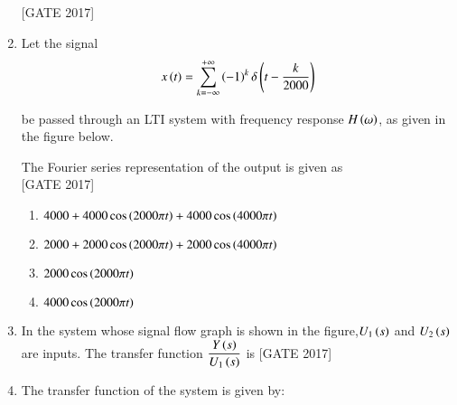 \documentclass[journal,12pt,onecolumn]{IEEEtran}
\theoremstyle{remark}
\begin{document}
\begin{enumerate}
\hfill{[GATE 2017]} \begin{enumerate}
\end{enumerate}
\item Let the signal
\begin{align*}
  x\left(t\right) = \sum_{k=-\infty}^{+\infty} \left(-1\right)^k \delta \left( t - \frac{k}{2000} \right)
\end{align*}

be passed through an LTI system with frequency response $H\left(\omega\right)$, as given in the figure below.



The Fourier series representation of the output is given as\\

\hfill{[GATE 2017]} \begin{enumerate}
 
        \item $ 4000 + 4000 \cos\left(2000 \pi t\right) + 4000 \cos\left(4000 \pi t\right) $   \item$ 2000 + 2000 \cos\left(2000 \pi t\right) + 2000 \cos\left(4000 \pi t\right)$
        \item $ 2000 \cos\left(2000 \pi t\right) $
       \item $ 4000 \cos\left(2000 \pi t\right)$\\
    
\end{enumerate}

\item In the system whose signal flow graph is shown in the figure,$ U_1\left(s\right)$ and  $U_2\left(s\right)$ are inputs. The transfer function $\dfrac{Y\left(s\right)}{U_1\left(s\right)}$  is
\hfill{[GATE 2017]} 

\begin{enumerate}
\end{enumerate}
\item The transfer function of the system is given by:


\end{enumerate}
\end{document}
